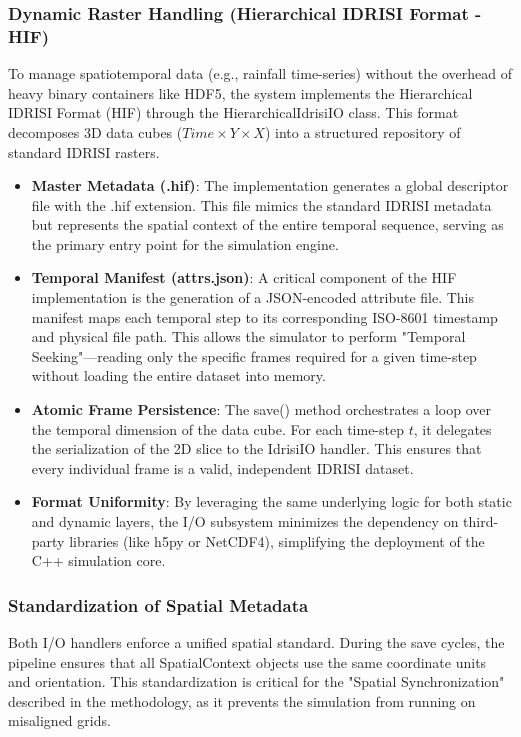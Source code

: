 \subsubsection{Dynamic Raster Handling (Hierarchical IDRISI Format - HIF)}

To manage spatiotemporal data (e.g., rainfall time-series) without the overhead of heavy binary containers like HDF5, 
the system implements the Hierarchical IDRISI Format (HIF) through the HierarchicalIdrisiIO class. This format 
decomposes 3D data cubes ($Time \times Y \times X$) into a structured repository of standard IDRISI rasters.

\begin{itemize}
    \item \textbf{Master Metadata (.hif)}: The implementation generates a global descriptor file with the .hif 
    extension. This file mimics the standard IDRISI metadata but represents the spatial context of the entire temporal 
    sequence, serving as the primary entry point for the simulation engine.
    \item \textbf{Temporal Manifest (attrs.json)}: A critical component of the HIF implementation is the generation of 
    a JSON-encoded attribute file. This manifest maps each temporal step to its corresponding ISO-8601 timestamp and 
    physical file path. This allows the simulator to perform "Temporal Seeking"—reading only the specific frames required 
    for a given time-step without loading the entire dataset into memory.
    \item \textbf{Atomic Frame Persistence}: The save() method orchestrates a loop over the temporal dimension of the 
    data cube. For each time-step $t$, it delegates the serialization of the 2D slice to the IdrisiIO handler. This 
    ensures that every individual frame is a valid, independent IDRISI dataset.
    \item \textbf{Format Uniformity}: By leveraging the same underlying logic for both static and dynamic layers, the 
    I/O subsystem minimizes the dependency on third-party libraries (like h5py or NetCDF4), simplifying the deployment 
    of the C++ simulation core.
\end{itemize}


\subsubsection{Standardization of Spatial Metadata}

Both I/O handlers enforce a unified spatial standard. During the save cycles, the pipeline ensures that 
all SpatialContext objects use the same coordinate units and orientation. This standardization is critical for the 
"Spatial Synchronization" described in the methodology, as it prevents the simulation from running on misaligned grids.


